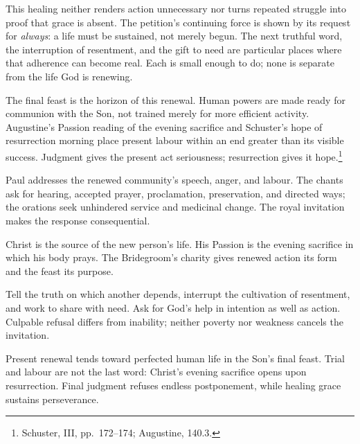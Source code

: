 This healing neither renders action
unnecessary nor turns repeated struggle
into proof that grace is absent. The
petition's continuing force is shown by
its request for \textit{always}: a life
must be sustained, not merely begun.
The next truthful word, the interruption
of resentment, and the gift to need are
particular places where that adherence
can become real. Each is small enough
to do; none is separate from the life
God is renewing.

The final feast is the horizon of this
renewal. Human powers are made ready for
communion with the Son, not trained
merely for more efficient activity.
Augustine's Passion reading of the
evening sacrifice and Schuster's hope
of resurrection morning place present
labour within an end greater than its
visible success. Judgment gives the
present act seriousness; resurrection
gives it hope.\footnote{Schuster,
 III, pp.~172--174;
Augustine,  140.3.}

\clearpage
\begin{fourSenses}
\item[Literal.] Paul addresses the renewed community's speech, anger,
and labour. The chants ask for hearing, accepted prayer, proclamation,
preservation, and directed ways; the orations seek unhindered service
and medicinal change. The royal invitation makes the response consequential.
\item[Allegorical.] Christ is the source of the new person's life. His
Passion is the evening sacrifice in which his body prays. The Bridegroom's
charity gives renewed action its form and the feast its purpose.
\item[Moral.] Tell the truth on which another depends, interrupt the
cultivation of resentment, and work to share with need. Ask for God's
help in intention as well as action. Culpable refusal differs from
inability; neither poverty nor weakness cancels the invitation.
\item[Anagogical.] Present renewal tends toward perfected human life
in the Son's final feast. Trial and labour are not the last word:
Christ's evening sacrifice opens upon resurrection. Final judgment
refuses endless postponement, while healing grace sustains perseverance.
\end{fourSenses}
